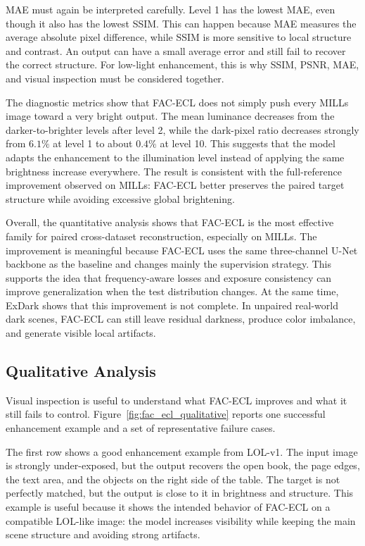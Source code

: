 MAE must again be interpreted carefully. Level 1 has the lowest MAE, even though it also has the lowest SSIM. This can happen because MAE measures the average absolute pixel difference, while SSIM is more sensitive to local structure and contrast. An output can have a small average error and still fail to recover the correct structure. For low-light enhancement, this is why SSIM, PSNR, MAE, and visual inspection must be considered together.

The diagnostic metrics show that FAC-ECL does not simply push every MILLs image toward a very bright output. The mean luminance decreases from the darker-to-brighter levels after level 2, while the dark-pixel ratio decreases strongly from $6.1\%$ at level 1 to about $0.4\%$ at level 10. This suggests that the model adapts the enhancement to the illumination level instead of applying the same brightness increase everywhere. The result is consistent with the full-reference improvement observed on MILLs: FAC-ECL better preserves the paired target structure while avoiding excessive global brightening.

Overall, the quantitative analysis shows that FAC-ECL is the most effective family for paired cross-dataset reconstruction, especially on MILLs. The improvement is meaningful because FAC-ECL uses the same three-channel U-Net backbone as the baseline and changes mainly the supervision strategy. This supports the idea that frequency-aware losses and exposure consistency can improve generalization when the test distribution changes. At the same time, ExDark shows that this improvement is not complete. In unpaired real-world dark scenes, FAC-ECL can still leave residual darkness, produce color imbalance, and generate visible local artifacts.

\subsection{Qualitative Analysis}

Visual inspection is useful to understand what FAC-ECL improves and what it still fails to control. Figure~\ref{fig:fac_ecl_qualitative} reports one successful enhancement example and a set of representative failure cases.



The first row shows a good enhancement example from LOL-v1. The input image is strongly under-exposed, but the output recovers the open book, the page edges, the text area, and the objects on the right side of the table. The target is not perfectly matched, but the output is close to it in brightness and structure. This example is useful because it shows the intended behavior of FAC-ECL on a compatible LOL-like image: the model increases visibility while keeping the main scene structure and avoiding strong artifacts.

